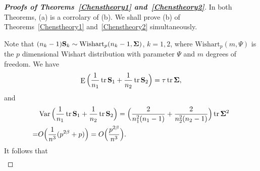 \documentclass[3p]{elsarticle}
\DeclareMathOperator{\mytr}{tr}
\DeclareMathOperator{\myE}{E}
\DeclareMathOperator{\myVar}{Var}
\theoremstyle{plain}
\theoremstyle{definition}
\theoremstyle{remark}
\begin{document}
\begin{appendices}
\begin{proof}[\textbf{Proofs of Theorems~\ref{Chenstheory1} and~\ref{Chenstheory2}}]
    In both Theorems, (a) is a corrolary of (b).
    We shall prove (b) of Theorems~\ref{Chenstheory1} and~\ref{Chenstheory2} simultaneously.
    
    Note that $(n_k-1)\BS_k\sim \text{Wishart}_p(n_k-1,\bSigma)$, $k=1,2$,
    where $\text{Wishart}_p(m,\Psi)$ is the $p$ dimensional Wishart distribution with parameter $\Psi$ and $m$ degrees of freedom.
    We have %
%
    $$
 \myE\Big(\frac{1}{n_1}\mytr \BS_1+\frac{1}{n_2}\mytr \BS_2\Big)=\tau \mytr\bSigma,
    $$
    and
    $$
    \begin{aligned}
        &\myVar\Big(\frac{1}{n_1}\mytr \BS_1+\frac{1}{n_2}\mytr \BS_2\Big)=
        \Big(\frac{2}{n_1^2(n_1-1)}+\frac{2}{n_2^2(n_2-1)}\Big)\mytr \bSigma^2\\
        =&
    O\Big(\frac{1}{n^3}(p^{2\beta}+p)\Big)=O\Big(\frac{p^{2\beta}}{n^3}\Big).
    \end{aligned}
    $$
    It follows that
    $$
    \begin{aligned}

\end{aligned}$$
\end{proof}
\end{appendices}
\end{document}
